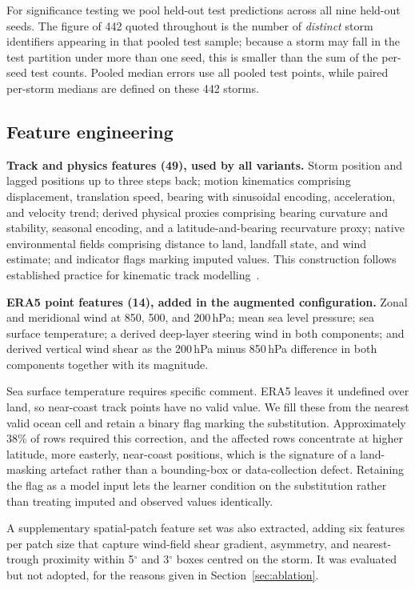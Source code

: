 \documentclass[10pt,twocolumn,a4paper]{article}
\newcommand{\era}{ERA5}
\begin{document}
For significance testing we pool held-out test predictions across all nine
held-out seeds. The figure of 442 quoted throughout is the number of \emph{distinct}
storm identifiers appearing in that pooled test sample; because a storm may fall
in the test partition under more than one seed, this is smaller than the sum of
the per-seed test counts. Pooled median errors use all pooled test points, while
paired per-storm medians are defined on these 442 storms.

\subsection{Feature engineering}
\textbf{Track and physics features (49), used by all variants.} Storm position and
lagged positions up to three steps back; motion kinematics comprising
displacement, translation speed, bearing with sinusoidal encoding, acceleration,
and velocity trend; derived physical proxies comprising bearing curvature and
stability, seasonal encoding, and a latitude-and-bearing recurvature proxy;
native environmental fields comprising distance to land, landfall state, and wind
estimate; and indicator flags marking imputed values. This construction follows
established practice for kinematic track
modelling~\cite{krishnamurti2010ann,lian2020novel}.

\textbf{\era{} point features (14), added in the augmented configuration.} Zonal
and meridional wind at 850, 500, and 200\,hPa; mean sea level pressure; sea
surface temperature; a derived deep-layer steering wind in both components; and
derived vertical wind shear as the 200\,hPa minus 850\,hPa difference in both
components together with its magnitude.

Sea surface temperature requires specific comment. \era{} leaves it undefined
over land, so near-coast track points have no valid value. We fill these from the
nearest valid ocean cell and retain a binary flag marking the substitution.
Approximately 38\% of rows required this correction, and the affected rows
concentrate at higher latitude, more easterly, near-coast positions, which is the
signature of a land-masking artefact rather than a bounding-box or
data-collection defect. Retaining the flag as a model input lets the learner
condition on the substitution rather than treating imputed and observed values
identically.

A supplementary spatial-patch feature set was also extracted, adding six features
per patch size that capture wind-field shear gradient, asymmetry, and nearest-trough
proximity within 5$^\circ$ and 3$^\circ$ boxes centred on the storm. It was
evaluated but not adopted, for the reasons given in Section~\ref{sec:ablation}.
\end{document}
